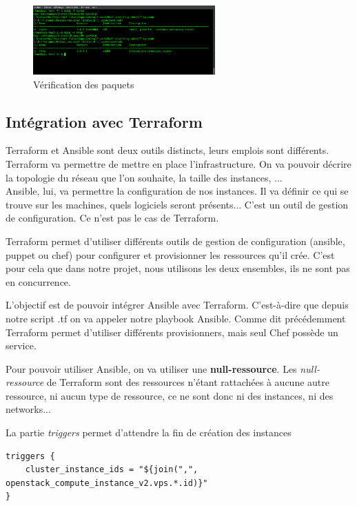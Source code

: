 \documentclass[]{article}
\begin{document}
\begin{figure}
\centering
\includegraphics[height=100px]{Images/verification.png}
\caption{Vérification des paquets}
\end{figure}




\subsection{Intégration avec Terraform}\label{intuxe9gration-avec-terraform}

Terraform et Ansible sont deux outils distincts, leurs emplois sont différents.\\
Terraform va permettre de mettre en place l'infrastructure. On va pouvoir décrire la topologie du réseau que l'on souhaite, la taille des instances, ... \\
Ansible, lui, va permettre la configuration de nos instances. Il va définir ce qui se trouve sur les machines, quels logiciels seront présents... C'est un outil de gestion de configuration. Ce n'est pas le cas de Terraform. 

Terraform permet d'utiliser différents outils de gestion de configuration (ansible, puppet ou chef) pour configurer et provisionner les ressources qu'il crée. C'est pour cela que dans notre projet, nous utilisons les deux ensembles, ils ne sont pas en concurrence. 

L'objectif est de pouvoir intégrer Ansible avec Terraform.
C'est-à-dire que depuis notre script .tf on va appeler notre playbook Ansible. 
Comme dit précédemment Terraform permet d'utiliser différents provisionners, mais seul Chef possède un service. 

Pour pouvoir utiliser Ansible, on va utiliser une \textbf{null-ressource}. Les \textit{null-ressource} de Terraform sont des ressources n'étant rattachées à aucune autre ressource, ni aucun type de ressource, ce ne sont donc ni des instances, ni des networks...

La partie \textit{triggers} permet d'attendre la fin de création des instances
\begin{verbatim}
triggers { 
    cluster_instance_ids = "${join(",", openstack_compute_instance_v2.vps.*.id)}"
}
\end{verbatim}
\end{document}
